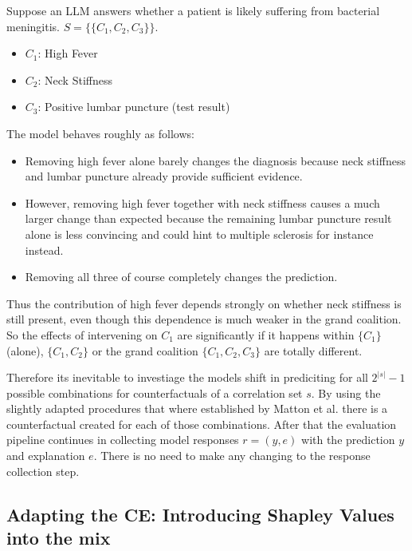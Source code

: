 \begin{example_box}[label=ex:all_combinations_motivation]
    Suppose an LLM answers whether a patient is likely suffering from bacterial meningitis. $S = \{\{C_1, C_2, C_3\}\}$.
    \begin{itemize}
    \item $C_1$: High Fever
    \item $C_2$: Neck Stiffness
    \item $C_3$: Positive lumbar puncture (test result)
    \end{itemize}

    The model behaves roughly as follows:
    \begin{itemize}
    \item Removing high fever alone barely changes the diagnosis because neck stiffness and lumbar puncture already provide sufficient evidence.
    \item However, removing high fever together with neck stiffness causes a much larger change than expected because the remaining lumbar puncture result alone is less convincing and could hint to multiple sclerosis for instance instead.
    \item Removing all three of course completely changes the prediction.
    \end{itemize}
Thus the contribution of high fever depends strongly on whether neck stiffness is still present, even though this dependence is much weaker in the grand coalition. So the effects of intervening on $C_1$ are significantly if it happens within $\{C_1\}$ (alone), $\{C_1, C_2\}$ or the grand coalition $\{C_1, C_2, C_3\}$ are totally different.
\end{example_box}

Therefore its inevitable to investiage the models shift in prediciting for all $2^{\lvert s \rvert}-1$ possible combinations for counterfactuals of a correlation set $s$. By using the slightly adapted procedures that where established by Matton et al. there is a counterfactual created for each of those combinations. After that the evaluation pipeline continues in collecting model responses $r=(y,e)$ with the prediction $y$ and explanation $e$. There is no need to make any changing to the response collection step.

\subsection{Adapting the CE: Introducing Shapley Values into the mix}
\label{sec:shapley}
